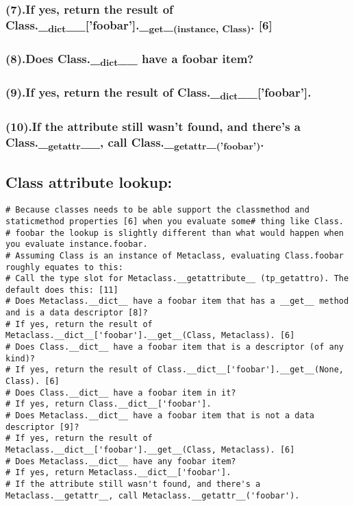 \documentclass[11pt]{article}
\begin{document}
\subsubsection{(7).If yes, return the result of Class.\_\textsubscript{dict}\_\_['foobar'].\_\textsubscript{get}\_\textsubscript{(instance, Class)}. [6]}
\label{sec:orgeeb66e8}
\subsubsection{(8).Does Class.\_\textsubscript{dict}\_\_ have a foobar item?}
\label{sec:org33fd87f}
\subsubsection{(9).If yes, return the result of Class.\_\textsubscript{dict}\_\_['foobar'].}
\label{sec:org9d2aead}
\subsubsection{(10).If the attribute still wasn't found, and there's a Class.\_\textsubscript{getattr}\_\_, call Class.\_\textsubscript{getattr}\_\textsubscript{('foobar')}.}
\label{sec:orgc299a00}
\subsection{Class attribute lookup:}
\label{sec:org2582e6a}
\begin{verbatim}
# Because classes needs to be able support the classmethod and staticmethod properties [6] when you evaluate some# thing like Class.
# foobar the lookup is slightly different than what would happen when you evaluate instance.foobar.
# Assuming Class is an instance of Metaclass, evaluating Class.foobar roughly equates to this:
# Call the type slot for Metaclass.__getattribute__ (tp_getattro). The default does this: [11]
# Does Metaclass.__dict__ have a foobar item that has a __get__ method and is a data descriptor [8]?
# If yes, return the result of Metaclass.__dict__['foobar'].__get__(Class, Metaclass). [6]
# Does Class.__dict__ have a foobar item that is a descriptor (of any kind)?
# If yes, return the result of Class.__dict__['foobar'].__get__(None, Class). [6]
# Does Class.__dict__ have a foobar item in it?
# If yes, return Class.__dict__['foobar'].
# Does Metaclass.__dict__ have a foobar item that is not a data descriptor [9]?
# If yes, return the result of Metaclass.__dict__['foobar'].__get__(Class, Metaclass). [6]
# Does Metaclass.__dict__ have any foobar item?
# If yes, return Metaclass.__dict__['foobar'].
# If the attribute still wasn't found, and there's a Metaclass.__getattr__, call Metaclass.__getattr__('foobar').
\end{verbatim}
\end{document}
